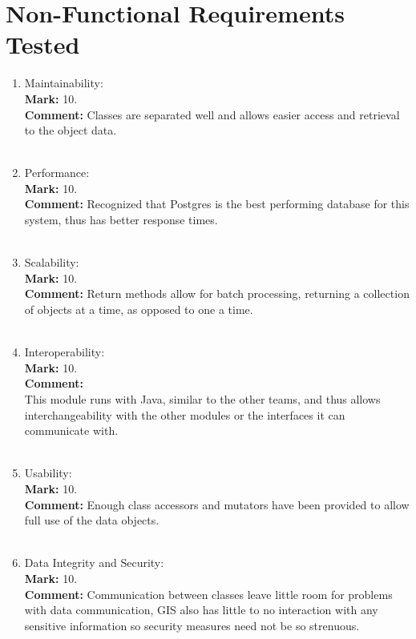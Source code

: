 \documentclass[12pt]{article}
\begin{document}
	\section{Non-Functional Requirements Tested}
	\begin{enumerate}
    \item Maintainability:\\
    \textbf{Mark: }
    10.\\
    \textbf{Comment:}
    Classes are separated well and allows easier access and retrieval to the object data.\\ \\
    
    \item Performance:\\
    \textbf{Mark: }
    10.\\
    \textbf{Comment:}
    Recognized that Postgres is the best performing database for this system, thus has better response times.\\ \\
    
    \item Scalability:\\
    \textbf{Mark: }
    10.\\
    \textbf{Comment:}
    Return methods allow for batch processing, returning a collection of objects at a time, as opposed to one a time.\\ \\
    
    \item Interoperability:\\
    \textbf{Mark: }
    10.\\
    \textbf{Comment:}\\
    This module runs with Java, similar to the other teams, and thus allows interchangeability with the other modules or the interfaces it can communicate with.\\ \\
    
    \item Usability:\\
    \textbf{Mark: }
    10.\\
    \textbf{Comment:}
    Enough class accessors and mutators have been provided to allow full use of the data objects.\\ \\
    
    \item Data Integrity and Security:\\
    \textbf{Mark: }
    10.\\
    \textbf{Comment:}
    Communication between classes leave little room for problems with data communication, GIS also has little to no interaction with any sensitive information so security measures need not be so strenuous.\\ \\
    

\end{enumerate}
\end{document}
